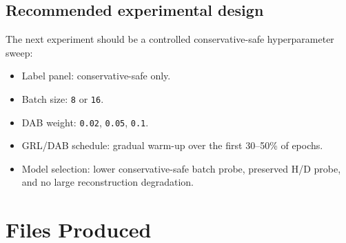 \documentclass[11pt]{article}
\newcommand{\code}[1]{\texttt{\small #1}}
\begin{document}
\subsection{Recommended experimental design}

The next experiment should be a controlled conservative-safe hyperparameter sweep:

\begin{itemize}
  \item Label panel: conservative-safe only.
  \item Batch size: \code{8} or \code{16}.
  \item DAB weight: \code{0.02}, \code{0.05}, \code{0.1}.
  \item GRL/DAB schedule: gradual warm-up over the first 30--50\% of epochs.
  \item Model selection: lower conservative-safe batch probe, preserved H/D probe, and no
  large reconstruction degradation.
\end{itemize}

\section{Files Produced}
\end{document}
